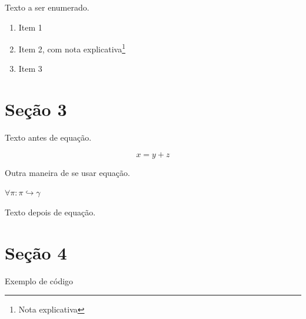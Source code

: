 Texto a ser enumerado.

\begin{enumerate}
   \item Item 1
   \item Item 2, com nota explicativa\footnote{Nota explicativa}
   \item Item 3
\end{enumerate}


\section{Seção 3}

Texto antes de equação.

\begin{equation}
   x = y + z
\end{equation}

Outra maneira de se usar equação.

$ \forall \pi : \pi \hookrightarrow \gamma $

Texto depois de equação.

\section{Seção 4}

Exemplo de código
